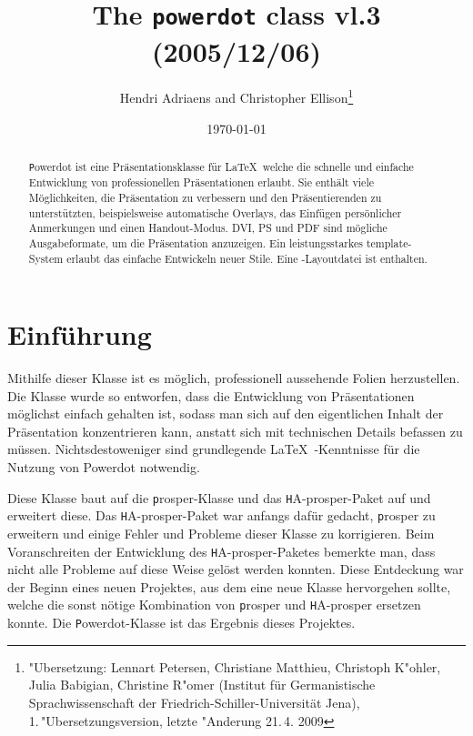 \documentclass[10pt,a4paper,ngerman]{article}
\begin{document}
\def\slash#1{\textbackslash{\tt #1}}
\def\pf#1{\texttt#1}

 \title{{\bf The} \texttt{powerdot} {\bf class} vl.3 (2005/12/06)}

 \author{Hendri Adriaens and Christopher
 Ellison\footnote{"Ubersetzung: Lennart Petersen, Christiane Matthieu, Christoph
 K"ohler, Julia Babigian, Christine R"omer (Institut für Germanistische
 Sprachwissenschaft der Friedrich-Schiller-Universität Jena), 1.\,"Ubersetzungsversion,
 letzte "Anderung 21.\,4. 2009}}



\date{\today}

\maketitle

\begin{footnotesize}
\begin{abstract}
\pf{Powerdot} ist eine Präsentationsklasse für \LaTeX\, welche die 
schnelle und einfache Entwicklung von professionellen Präsentationen 
erlaubt. Sie enthält viele Möglichkeiten, die Präsentation zu verbessern 
und den Präsentierenden zu unterstützten, beispielsweise automatische 
Overlays, das Einfügen persönlicher Anmerkungen und einen Handout-Modus. 
DVI, PS und PDF sind mögliche Ausgabeformate, um die Präsentation 
anzuzeigen. Ein leistungsstarkes template-System erlaubt das einfache 
Entwickeln neuer Stile. Eine \LyX -Layoutdatei ist enthalten.
\end{abstract}

\tableofcontents

\end{footnotesize}

\section{Einführung}\label{sec:intro}
Mithilfe dieser Klasse ist es möglich, professionell aussehende 
Folien herzustellen. Die Klasse wurde so entworfen, dass die Entwicklung 
von Präsentationen möglichst einfach gehalten ist, sodass man sich auf 
den eigentlichen Inhalt der Präsentation konzentrieren kann, anstatt sich 
mit technischen Details befassen zu müssen. Nichtsdestoweniger sind 
grundlegende \LaTeX\ -Kenntnisse für die Nutzung von Powerdot notwendig.

Diese Klasse baut auf die \pf{prosper}-Klasse \cite{prosper} und das 
\pf{HA-prosper}-Paket \cite{HA-prosper} auf und erweitert diese. Das 
\pf{HA-prosper}-Paket war anfangs dafür gedacht, \pf{prosper} zu erweitern 
und einige Fehler und Probleme dieser Klasse zu korrigieren. Beim Voranschreiten 
der Entwicklung des \pf{HA-prosper}-Paketes bemerkte man, dass nicht alle 
Probleme auf diese Weise gelöst werden konnten. Diese Entdeckung war der 
Beginn eines neuen Projektes, aus dem eine neue Klasse hervorgehen sollte, 
welche die sonst nötige Kombination von \pf{prosper} und \pf{HA-prosper} 
ersetzen konnte. Die \pf{Powerdot}-Klasse ist das Ergebnis dieses Projektes.
\end{document}

